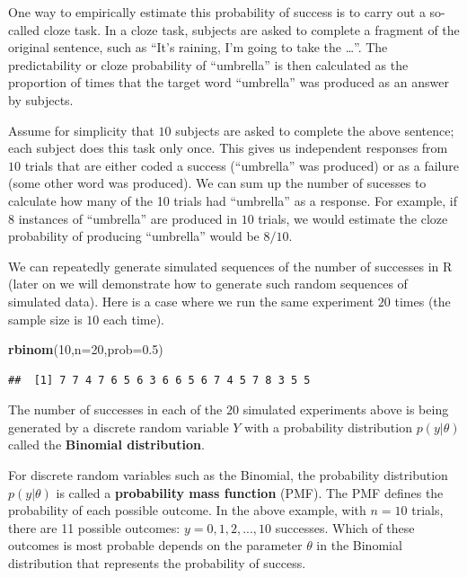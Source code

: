 \documentclass[12pt,]{krantz}
\newenvironment{Shaded}{\begin{snugshade}}{\end{snugshade}}
\newcommand{\DataTypeTok}[1]{\textcolor[rgb]{0.13,0.29,0.53}{#1}}
\newcommand{\DecValTok}[1]{\textcolor[rgb]{0.00,0.00,0.81}{#1}}
\newcommand{\FloatTok}[1]{\textcolor[rgb]{0.00,0.00,0.81}{#1}}
\newcommand{\KeywordTok}[1]{\textcolor[rgb]{0.13,0.29,0.53}{\textbf{#1}}}
\newcommand{\NormalTok}[1]{#1}
\theoremstyle{definition}
\theoremstyle{definition}
\theoremstyle{definition}
\theoremstyle{remark}
\begin{document}
One way to empirically estimate this probability of success is to carry out a so-called cloze task. In a cloze task, subjects are asked to complete a fragment of the original sentence, such as ``It's raining, I'm going to take the \ldots{}''. The predictability or cloze probability of ``umbrella'' is then calculated as the proportion of times that the target word ``umbrella'' was produced as an answer by subjects.

Assume for simplicity that \(10\) subjects are asked to complete the above sentence; each subject does this task only once. This gives us independent responses from \(10\) trials that are either coded a success (``umbrella'' was produced) or as a failure (some other word was produced). We can sum up the number of sucesses to calculate how many of the 10 trials had ``umbrella'' as a response. For example, if \(8\) instances of ``umbrella'' are produced in \(10\) trials, we would estimate the cloze probability of producing ``umbrella'' would be \(8/10\).

We can repeatedly generate simulated sequences of the number of successes in R (later on we will demonstrate how to generate such random sequences of simulated data). Here is a case where we run the same experiment \(20\) times (the sample size is \(10\) each time).

\begin{Shaded}
\begin{Highlighting}[]
\KeywordTok{rbinom}\NormalTok{(}\DecValTok{10}\NormalTok{,}\DataTypeTok{n=}\DecValTok{20}\NormalTok{,}\DataTypeTok{prob=}\FloatTok{0.5}\NormalTok{)}
\end{Highlighting}
\end{Shaded}

\begin{verbatim}
##  [1] 7 7 4 7 6 5 6 3 6 6 5 6 7 4 5 7 8 3 5 5
\end{verbatim}

The number of successes in each of the \(20\) simulated experiments above is being generated by a discrete random variable \(Y\) with a probability distribution \(p(y|\theta)\) called the \textbf{Binomial distribution}.

For discrete random variables such as the Binomial, the probability distribution \(p(y|\theta)\) is called a \textbf{probability mass function} (PMF). The PMF defines the probability of each possible outcome. In the above example, with \(n=10\) trials, there are 11 possible outcomes: \(y=0,1,2,...,10\) successes. Which of these outcomes is most probable depends on the parameter \(\theta\) in the Binomial distribution that represents the probability of success.
\end{document}
